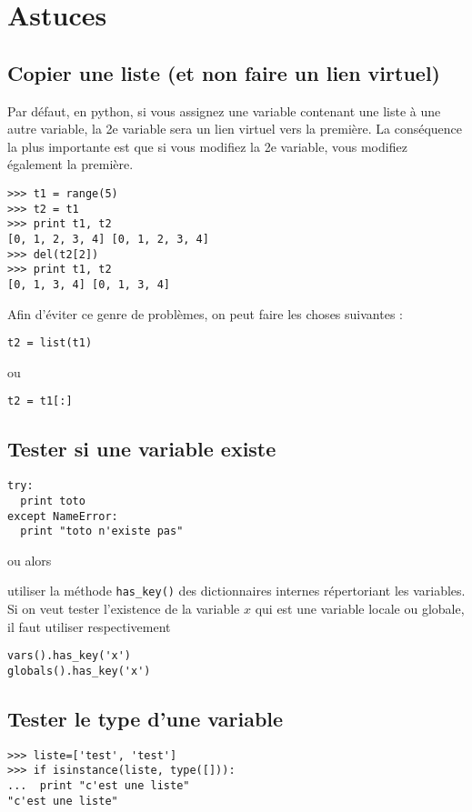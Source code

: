 \documentclass[a4paper,twoside]{article}
\begin{document}
\section{Astuces}
\subsection{Copier une liste (et non faire un lien virtuel)}
Par défaut, en python, si vous assignez une variable contenant une liste à une autre variable, la 2e variable sera un lien virtuel vers la première. La conséquence la plus importante est que si vous modifiez la 2e variable, vous modifiez également la première.

\begin{exemple}
\begin{verbatim}
>>> t1 = range(5)
>>> t2 = t1
>>> print t1, t2
[0, 1, 2, 3, 4] [0, 1, 2, 3, 4]
>>> del(t2[2])
>>> print t1, t2
[0, 1, 3, 4] [0, 1, 3, 4]
\end{verbatim}
\end{exemple}

Afin d'éviter ce genre de problèmes, on peut faire les choses suivantes :
\begin{verbatim}
t2 = list(t1)
\end{verbatim}
ou
\begin{verbatim}
t2 = t1[:]
\end{verbatim}


\subsection{Tester si une variable existe}
\begin{verbatim}
try:
  print toto
except NameError:
  print "toto n'existe pas"
\end{verbatim}

ou alors

utiliser la méthode \texttt{has\_key()} des dictionnaires internes répertoriant les variables. Si on veut tester l'existence de la variable $x$  qui est une variable locale ou globale, il faut utiliser respectivement
\begin{verbatim}
vars().has_key('x')
globals().has_key('x')
\end{verbatim}

\subsection{Tester le type d'une variable}
\begin{verbatim}
>>> liste=['test', 'test']
>>> if isinstance(liste, type([])):
...  print "c'est une liste"
"c'est une liste"
\end{verbatim}
\end{document}
